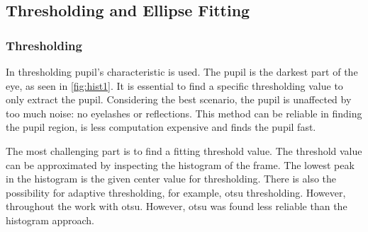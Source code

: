 \subsection{Thresholding and Ellipse Fitting}
\subsubsection{Thresholding}
In thresholding pupil's characteristic is used. The pupil is the darkest part of the eye, as seen in \ref{fig:hist1}. It is essential to find a specific thresholding value to only extract the pupil. Considering the best scenario, the pupil is unaffected by too much noise: no eyelashes or reflections. This method can be reliable in finding the pupil region, is less computation expensive and finds the pupil fast. 

The most challenging part is to find a fitting threshold value. The threshold value can be approximated by inspecting the histogram of the frame. The lowest peak in the histogram is the given center value for thresholding. There is also the possibility for adaptive thresholding, for example, otsu thresholding. However, throughout the work with otsu. However, otsu was found less reliable than the histogram approach. 

